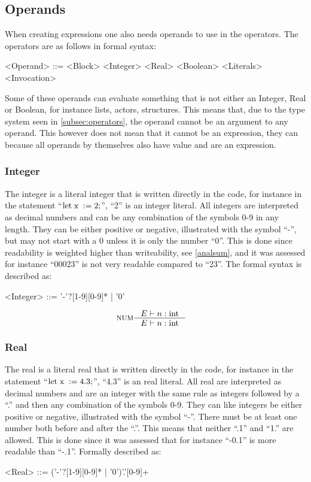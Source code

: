 \subsection{Operands}
When creating expressions one also needs operands to use in the operators. The operators are as follows in formal syntax:
\begin{grammar}
<Operand>	::= <Block>
 \alt <Integer>
 \alt <Real>
 \alt <Boolean>
 \alt <Literals>
 \alt <Invocation>
\end{grammar}
Some of these operands can evaluate something that is not either an Integer, Real or Boolean, for instance lists, actors, structures. This means that, due to the type system seen in \cref{subsec:operators}, the operand cannot be an argument to any operand. This however does not mean that it cannot be an expression, they can because all operands by themselves also have value and are an expression.

\subsubsection{Integer}
The integer is a literal integer that is written directly in the code, for instance in the statement \enquote{$\text{let} \mathbin{\; \text{x} \;} := 2;$}, \enquote{2} is an integer literal. All integers are interpreted as decimal numbers and can be any combination of the symbols 0-9 in any length. They can be either positive or negative, illustrated with the symbol \enquote{-}, but may not start with a 0 unless it is only the number \enquote{0}. This is done since readability is weighted higher than writeability, see \cref{analsum}, and it was assessed for instance \enquote{00023} is not very readable compared to \enquote{23}. The formal syntax is described as:
\begin{grammar}
<Integer> ::= '-'?[1-9][0-9]* | '0'
\end{grammar}

\begin{align*}
&\inference[NUM]{\Tenv n:\Tint}
                 {\Tenv n: \Tint} 
\end{align*}

\subsubsection{Real}
The real is a literal real that is written directly in the code, for instance in the statement \enquote{$\text{let} \mathbin{\; \text{x} \;} := 4.3;$}, \enquote{4.3} is an real literal. All real are interpreted as decimal numbers and are an integer with the same rule as integers followed by a \enquote{.} and then any combination of the symbols 0-9. They can like integers be either positive or negative, illustrated with the symbol \enquote{-}. There must be at least one number both before and after the \enquote{.}. This means that neither \enquote{.1} and \enquote{1.} are allowed. This is done since it was assessed that for instance \enquote{-0.1} is more readable than \enquote{-.1}. Formally described as:
\begin{grammar}
<Real> ::= ('-'?[1-9][0-9]* | '0')'.'[0-9]+
\end{grammar}

